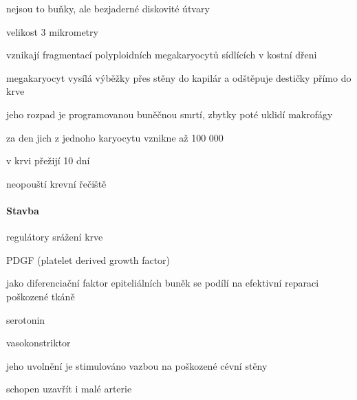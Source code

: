 \documentclass[DIV=8]{scrreprt}
\begin{document}
\begin{myItemize}[nosep]
    \item nejsou to buňky, ale bezjaderné diskovité útvary
    \item velikost 3 mikrometry
    \item vznikají fragmentací polyploidních megakaryocytů sídlících v kostní dřeni
\begin{myItemize}[nosep]
    \item megakaryocyt vysílá výběžky přes stěny do kapilár a odštěpuje destičky přímo do krve
\begin{myItemize}[nosep]
    \item jeho rozpad je programovanou buněčnou smrtí, zbytky poté uklidí makrofágy
\end{myItemize}

    \item za den jich z jednoho karyocytu vznikne až 100 000
\end{myItemize}

    \item v krvi přežijí 10 dní
    \item neopouští krevní řečiště
\end{myItemize}



\paragraph{Stavba}
\begin{myItemize}[nosep]
    \item regulátory srážení krve
\begin{myItemize}[nosep]
    \item PDGF (platelet derived growth factor)
\begin{myItemize}[nosep]
    \item jako diferenciační faktor epiteliálních buněk se podílí na efektivní reparaci poškozené tkáně
\end{myItemize}

    \item serotonin
\begin{myItemize}[nosep]
    \item vasokonstriktor
    \item jeho uvolnění je stimulováno vazbou na poškozené cévní stěny
    \item schopen uzavřít i malé arterie
\end{myItemize}

\end{myItemize}

\end{myItemize}
\end{document}
